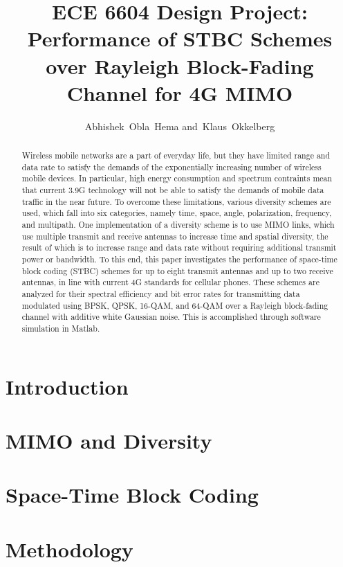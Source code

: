 \documentclass[12pt,onecolumn]{IEEEtran}
\title{ECE 6604 Design Project:\\ Performance of STBC Schemes over Rayleigh Block-Fading Channel for 4G MIMO}
\author{Abhishek~Obla~Hema and~Klaus~Okkelberg}
\begin{document}
\maketitle

\begin{abstract}
  Wireless mobile networks are a part of everyday life, but they have limited range and data rate to satisfy the demands of the exponentially increasing number of wireless mobile devices. In particular, high energy consumption and spectrum contraints mean that current 3.9G technology will not be able to satisfy the demands of mobile data traffic in the near future. To overcome these limitations, various diversity schemes are used, which fall into six categories, namely time, space, angle, polarization, frequency, and multipath. One implementation of a diversity scheme is to use MIMO links, which use multiple transmit and receive antennas to increase time and spatial diversity, the result of which is to increase range and data rate without requiring additional transmit power or bandwidth. To this end, this paper investigates the performance of space-time block coding (STBC) schemes for up to eight transmit antennas and up to two receive antennas, in line with current 4G standards for cellular phones. These schemes are analyzed for their spectral efficiency and bit error rates for transmitting data modulated using BPSK, QPSK, 16-QAM, and 64-QAM over a Rayleigh block-fading channel with additive white Gaussian noise. This is accomplished through software simulation in Matlab.
\end{abstract}

\section{Introduction}


\section{MIMO and Diversity}


\section{Space-Time Block Coding}


\section{Methodology}

\end{document}
